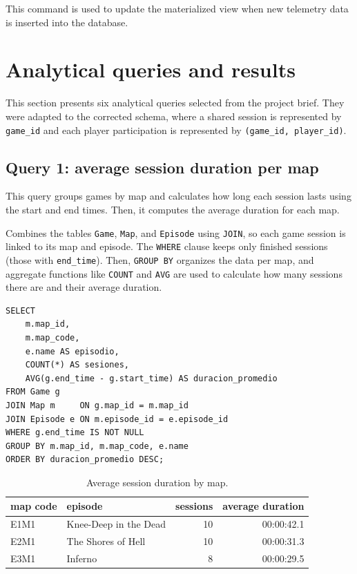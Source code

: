 \documentclass[11pt]{article}
\begin{document}
This command is used to update the materialized view when new telemetry data is inserted into the database.
\clearpage
\section{Analytical queries and results}
This section presents six analytical queries selected from the project brief. They were adapted to the corrected schema, where a shared session is represented by \texttt{game\_id} and each player participation is represented by \texttt{(game\_id, player\_id)}.

\subsection{Query 1: average session duration per map}
This query groups games by map and calculates how long each session lasts using the start and end times. Then, it computes the average duration for each map.

Combines the tables \texttt{Game}, \texttt{Map}, and \texttt{Episode} using \texttt{JOIN}, so each game session is linked to its map and episode. The \texttt{WHERE} clause keeps only finished sessions (those with \texttt{end\_time}). Then, \texttt{GROUP BY} organizes the data per map, and aggregate functions like \texttt{COUNT} and \texttt{AVG} are used to calculate how many sessions there are and their average duration.

\begin{lstlisting}[style=sqlstyle]
SELECT
    m.map_id,
    m.map_code,
    e.name AS episodio,
    COUNT(*) AS sesiones,
    AVG(g.end_time - g.start_time) AS duracion_promedio
FROM Game g
JOIN Map m     ON g.map_id = m.map_id
JOIN Episode e ON m.episode_id = e.episode_id
WHERE g.end_time IS NOT NULL
GROUP BY m.map_id, m.map_code, e.name
ORDER BY duracion_promedio DESC;
\end{lstlisting}

\begin{table}[H]
\centering
\begin{tabular}{llrr}
\toprule
\textbf{map code} & \textbf{episode} & \textbf{sessions} & \textbf{average duration} \\
\midrule
E1M1 & Knee-Deep in the Dead & 10 & 00:00:42.1 \\
E2M1 & The Shores of Hell & 10 & 00:00:31.3 \\
E3M1 & Inferno & 8 & 00:00:29.5 \\
\bottomrule
\end{tabular}
\caption{Average session duration by map.}
\end{table}
\end{document}
